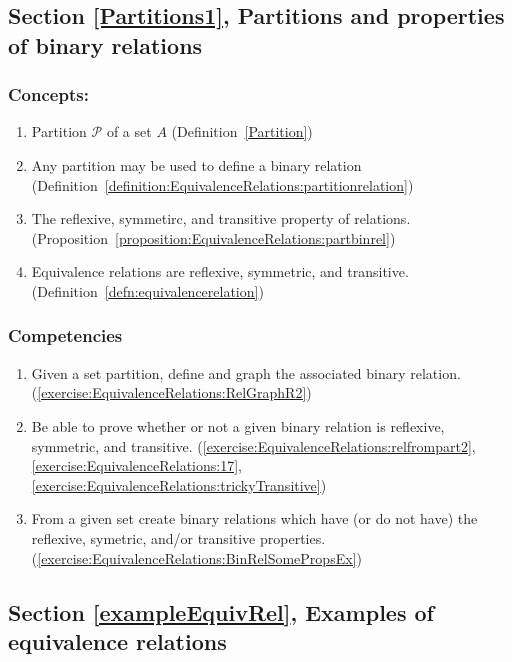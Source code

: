 \subsection*{Section \ref{Partitions1}, Partitions and properties of binary relations}
\subsubsection*{Concepts:}
\begin{enumerate}
\item 
Partition $\mathcal{P}$ of a set $A$ (Definition~\ref{Partition})
\item 
Any partition may be used to define a binary relation (Definition~\ref{definition:EquivalenceRelations:partitionrelation})
\item 
The reflexive, symmetirc, and transitive property of relations. (Proposition~\ref{proposition:EquivalenceRelations:partbinrel})
\item 
Equivalence relations are reflexive, symmetric, and transitive. (Definition~\ref{defn:equivalencerelation})
\end{enumerate}

\subsubsection*{Competencies}
\begin{enumerate}
\item
Given a set partition, define and graph the associated binary relation. (\ref{exercise:EquivalenceRelations:RelGraphR2})
\item
Be able to prove whether or not a given binary relation is reflexive, symmetric, and transitive. (\ref{exercise:EquivalenceRelations:relfrompart2}, \ref{exercise:EquivalenceRelations:17}, \ref{exercise:EquivalenceRelations:trickyTransitive})
\item
From a given set create binary relations which have (or do not have) the reflexive, symetric, and/or transitive properties. (\ref{exercise:EquivalenceRelations:BinRelSomePropsEx})
\end{enumerate}


\subsection*{Section \ref{exampleEquivRel}, Examples of equivalence relations}
